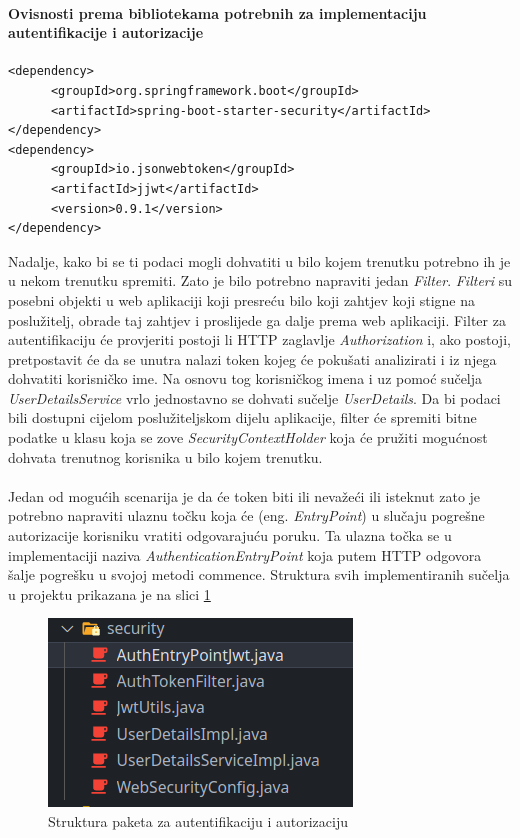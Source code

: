 \documentclass[times, utf8, zavrsni]{fer}
\begin{document}
\paragraph{Ovisnosti prema bibliotekama potrebnih za implementaciju autentifikacije i autorizacije}
\label{Security dependency}
\begin{Verbatim}[fontsize=\scriptsize]
<dependency>
      <groupId>org.springframework.boot</groupId>
      <artifactId>spring-boot-starter-security</artifactId>
</dependency>
<dependency>
      <groupId>io.jsonwebtoken</groupId>
      <artifactId>jjwt</artifactId>
      <version>0.9.1</version>
</dependency>
\end{Verbatim}
Nadalje, kako bi se ti podaci mogli dohvatiti u bilo kojem trenutku potrebno ih je u nekom trenutku spremiti.
Zato je bilo potrebno napraviti jedan \textit{Filter}. \textit{Filteri} su posebni objekti u web aplikaciji koji presreću bilo koji
zahtjev koji stigne na poslužitelj, obrade taj zahtjev i proslijede ga dalje prema web aplikaciji.
Filter za autentifikaciju će provjeriti postoji li HTTP zaglavlje \textit{Authorization} i, ako
postoji, pretpostavit će da se unutra nalazi token kojeg će pokušati analizirati i iz njega dohvatiti korisničko ime.
Na osnovu tog korisničkog imena i uz pomoć sučelja \textit{UserDetailsService} vrlo jednostavno se dohvati sučelje \textit{UserDetails}.
Da bi podaci bili dostupni cijelom poslužiteljskom dijelu aplikacije, filter će spremiti bitne podatke u klasu koja se zove
\textit{SecurityContextHolder} koja će pružiti mogućnost dohvata trenutnog
korisnika u bilo kojem trenutku.
\\\\
Jedan od mogućih scenarija je da će token biti ili nevažeći ili isteknut zato je potrebno napraviti
ulaznu točku koja će (eng. \textit{EntryPoint}) u slučaju pogrešne autorizacije korisniku vratiti odgovarajuću poruku. Ta
ulazna točka
se u implementaciji naziva \textit{AuthenticationEntryPoint} koja putem HTTP odgovora šalje pogrešku u svojoj metodi commence. Struktura
svih implementiranih sučelja u projektu prikazana je na slici \ref{fig:Security}

\begin{figure}[h]
      \centering
      \includegraphics[width=.5\textwidth]{security_implementation.png}
      \caption{Struktura paketa za autentifikaciju i autorizaciju}
      \label{fig:Security}
\end{figure}
\end{document}
